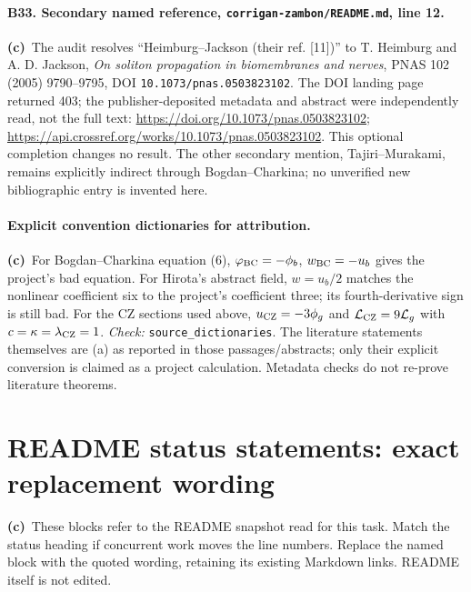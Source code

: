 \documentclass[11pt,a4paper]{article}
\newcommand{\C}{\textbf{(c)}\ }
\newcommand{\file}[1]{\nolinkurl{#1}}
\newcommand{\test}[1]{\textit{Check:} \file{#1}.}
\begin{document}
\paragraph{B33. Secondary named reference, \file{corrigan-zambon/README.md}, line 12.}
\C The audit resolves ``Heimburg--Jackson (their ref. [11])'' to T. Heimburg
and A. D. Jackson, \emph{On soliton propagation in biomembranes and nerves},
PNAS 102 (2005) 9790--9795, DOI \file{10.1073/pnas.0503823102}.
The DOI landing page returned 403; the publisher-deposited metadata and
abstract were independently read, not the full text:
\url{https://doi.org/10.1073/pnas.0503823102};
\url{https://api.crossref.org/works/10.1073/pnas.0503823102}.
This optional completion changes no result. The other secondary mention,
Tajiri--Murakami, remains explicitly indirect through Bogdan--Charkina;
no unverified new bibliographic entry is invented here.

\paragraph{Explicit convention dictionaries for attribution.}
\C For Bogdan--Charkina equation (6), $\varphi_{\rm BC}=-\phi_b$,
$w_{\rm BC}=-u_b$ gives the project's bad equation. For Hirota's abstract
field, $w=u_b/2$ matches the nonlinear coefficient six to the project's
coefficient three; its fourth-derivative sign is still bad.
For the CZ sections used above, $u_{\rm CZ}=-3\phi_g$ and
$\mathcal L_{\rm CZ}=9\mathcal L_g$ with $c=\kappa=\lambda_{\rm CZ}=1$.
\test{source_dictionaries} The literature statements themselves are (a)
as reported in those passages/abstracts; only their explicit conversion is
claimed as a project calculation. Metadata checks do not re-prove literature
theorems.

\newpage
\section{README status statements: exact replacement wording}
\C These blocks refer to the README snapshot read for this task. Match the
status heading if concurrent work moves the line numbers. Replace the named
block with the quoted wording, retaining its existing Markdown links.
README itself is not edited.
\end{document}
